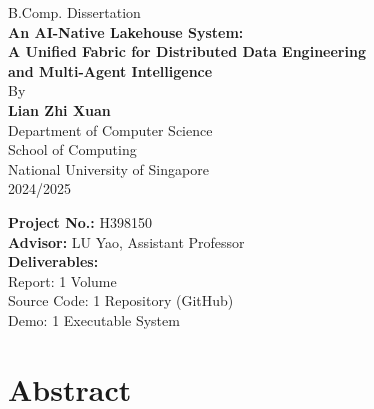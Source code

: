 \documentclass[12pt, a4paper]{report}
\begin{document}
\begin{titlepage}
  \begin{center}
    \vspace*{0.5cm}
    {\large B.Comp. Dissertation}\\[1.5cm]

    {\LARGE\bfseries An AI-Native Lakehouse System: \\[0.4em]
      A Unified Fabric for Distributed Data Engineering \\[0.3em]
      and Multi-Agent Intelligence}\\[2cm]

    {\large By}\\[0.3cm]
    {\large\bfseries Lian Zhi Xuan}\\[1.5cm]

    {\large Department of Computer Science}\\[0.2cm]
    {\large School of Computing}\\[0.2cm]
    {\large National University of Singapore}\\[0.2cm]
    {\large 2024/2025}\\[1cm]

    \begin{flushleft}
      \textbf{Project No.:} 	H398150\\[0.3cm]
      \textbf{Advisor:} LU Yao, Assistant Professor\\[0.3cm]
      \textbf{Deliverables:}\\
      \hspace{1cm} Report: 1 Volume\\
      \hspace{1cm} Source Code: 1 Repository (GitHub)\\
      \hspace{1cm} Demo: 1 Executable System
    \end{flushleft}
  \end{center}
\end{titlepage}

\chapter*{Abstract}
\end{document}
